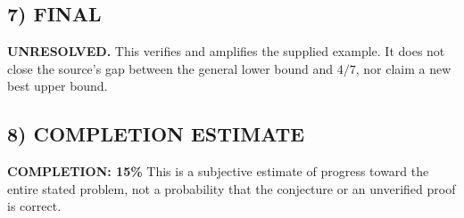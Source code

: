 \subsection*{7) FINAL}
\textbf{UNRESOLVED.} This verifies and amplifies the supplied example. It does not close the source's gap between the general lower bound and $4/7$, nor claim a new best upper bound.

\subsection*{8) COMPLETION ESTIMATE}
\textbf{COMPLETION: 15\%}
This is a subjective estimate of progress toward the entire stated problem, not a probability that the conjecture or an unverified proof is correct.
